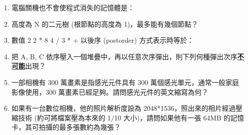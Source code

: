 \documentclass[12pt,a4paper]{report}
\begin{document}
\begin{CJK}{UTF8}{bkai}
\begin{enumerate}
\begin{optionlist}
  \end{optionlist}
\item 電腦關機也不會使程式消失的記憶體是：
\item 高度為 N 的二元樹 (根節點的高度為 1)，最多能有幾個節點？
\item 數值 2 2 * 8 4 / 3 * + 以後序 (postorder) 方式表示時等於：
\item 把 A, B, C 依序壓入一個堆疊中，再以任意次序彈出，則下列何種彈出次序\underline{\textbf{不可能}}出現？
\item 一部相機有 300 萬畫素是指感光元件具有 300 萬個感光單元，通常一般家庭影像使用，300 萬畫素已經足夠。請問感光元件的英文縮寫為何？
\item 如果有一台數位相機，他的照片解析度設為 2048*1536，照出來的相片經過壓縮技術 (約可將檔案壓為本來的 1/10 大小)，請問如果他有一張 64MB 的記憶卡，其可拍攝的最多張數約為幾張？

\end{enumerate}
\end{CJK}
\end{document}
